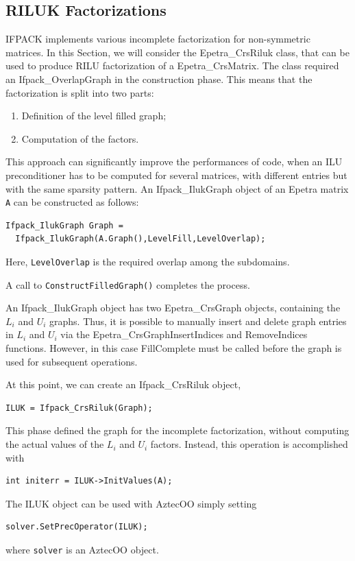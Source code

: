 \subsection{RILUK  Factorizations}
\label{sec:ifpack_rilu}

IFPACK implements various incomplete factorization for non-symmetric
matrices. In this Section, we will consider the Epetra\_CrsRiluk class,
that can be used to produce RILU factorization of a Epetra\_CrsMatrix.
The class required an Ifpack\_OverlapGraph in the construction phase.
This means that the factorization is split into two parts:
\begin{enumerate}
\item Definition of the level filled graph;
\item Computation of the factors.
\end{enumerate}
This approach can significantly improve the performances of code, when
an ILU preconditioner has to be computed for several matrices, with
different entries but with the same sparsity pattern. An
Ifpack\_IlukGraph object of an Epetra matrix \verb!A! can be constructed
as follows:
\begin{verbatim}
Ifpack_IlukGraph Graph = 
  Ifpack_IlukGraph(A.Graph(),LevelFill,LevelOverlap);
\end{verbatim}
Here, \verb!LevelOverlap! is the required overlap among the subdomains.

A call to \verb!ConstructFilledGraph()! completes the process.

\begin{remark}
  An Ifpack\_IlukGraph object has two Epetra\_CrsGraph objects,
  containing the $L_i$ and $U_i$ graphs. Thus, it is possible to
  manually insert and delete graph entries in $L_i$ and $U_i$ via the
  Epetra\_CrsGraphInsertIndices and RemoveIndices functions. However, in
  this case FillComplete must be called before the graph is used for
  subsequent operations.
\end{remark}

At this point, we can create an Ifpack\_CrsRiluk object,
\begin{verbatim}
ILUK = Ifpack_CrsRiluk(Graph);
\end{verbatim}
This phase defined the graph for the incomplete factorization, without
computing the actual values of the $L_i$ and $U_i$ factors. Instead,
this operation is accomplished with
\begin{verbatim}
int initerr = ILUK->InitValues(A);
\end{verbatim}
The ILUK object can be used with AztecOO simply setting
\begin{verbatim}
solver.SetPrecOperator(ILUK);
\end{verbatim}
where \verb!solver! is an AztecOO object.
\smallskip

